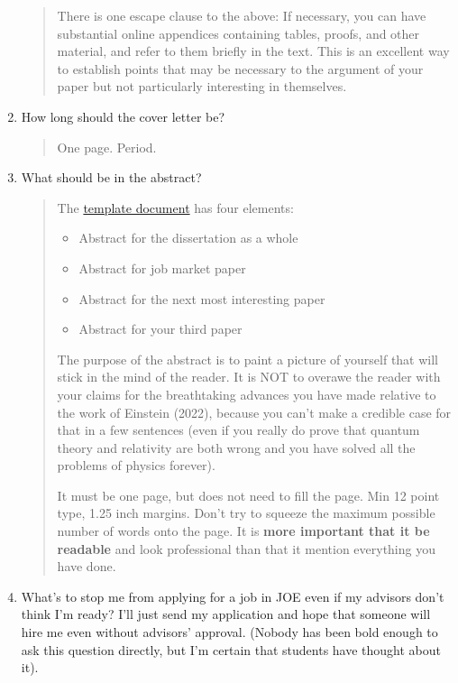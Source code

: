\documentclass{\classes/econtex}
\begin{document}
\begin{enumerate}
\begin{quote}
    There is one escape clause to the above: If necessary, you can have
    substantial online appendices containing tables, proofs, and other material, and
    refer to them briefly in the text.  This is an excellent way to
    establish points that may be necessary to the argument of your paper
    but not particularly interesting in themselves.   

  \end{quote}

\item  How long should the cover letter be?
  \begin{quote}
    One page.  Period.

  \end{quote}

\item  What should be in the abstract?
  \begin{quote}
    The \href{\bloburl/moniker-dir-make/Abstract.tex}{template document} has four elements:
    \begin{itemize}
    \item Abstract for the dissertation as a whole
    \item Abstract for job market paper
    \item Abstract for the next most interesting paper
    \item Abstract for your third paper
    \end{itemize}

    The purpose of the abstract is to paint a picture of yourself that will stick in the mind of the reader.  It is NOT to overawe the reader with your claims for the breathtaking advances you have made relative to the work of Einstein (2022), because you can't make a credible case for that in a few sentences (even if you really do prove that quantum theory and relativity are both wrong and you have solved all the problems of physics forever).

    It must be one page, but does not need to fill the page.  Min 12 point type, 1.25 inch margins.  Don't try to squeeze the maximum possible number of words onto the page.  It is \textbf{more important that it be readable} and look professional than that it mention everything you have done.

  \end{quote}

\item  What's to stop me from applying for a job in JOE even if my advisors don't think I'm ready?  I'll just send my application and hope that someone will hire me even without advisors' approval.  (Nobody has been bold enough to ask this question directly, but I'm certain that students have thought about it).


\end{enumerate}
\end{document}
